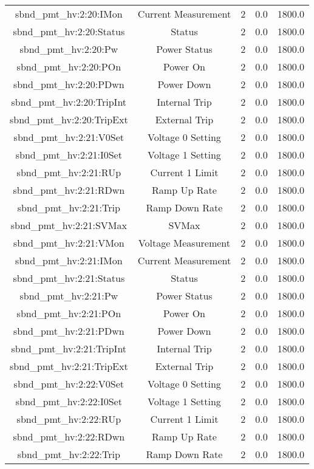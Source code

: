 \begin{table}[ptb]
\begin{tabular}{c | c c c c}
sbnd_pmt_hv:2:20:IMon & Current Measurement & 2 & 0.0 & 1800.0\\ 
sbnd_pmt_hv:2:20:Status & Status & 2 & 0.0 & 1800.0\\ 
sbnd_pmt_hv:2:20:Pw & Power Status & 2 & 0.0 & 1800.0\\ 
sbnd_pmt_hv:2:20:POn & Power On & 2 & 0.0 & 1800.0\\ 
sbnd_pmt_hv:2:20:PDwn & Power Down & 2 & 0.0 & 1800.0\\ 
sbnd_pmt_hv:2:20:TripInt & Internal Trip & 2 & 0.0 & 1800.0\\ 
sbnd_pmt_hv:2:20:TripExt & External Trip & 2 & 0.0 & 1800.0\\ 
sbnd_pmt_hv:2:21:V0Set & Voltage 0 Setting & 2 & 0.0 & 1800.0\\ 
sbnd_pmt_hv:2:21:I0Set & Voltage 1 Setting & 2 & 0.0 & 1800.0\\ 
sbnd_pmt_hv:2:21:RUp & Current 1 Limit & 2 & 0.0 & 1800.0\\ 
sbnd_pmt_hv:2:21:RDwn & Ramp Up Rate & 2 & 0.0 & 1800.0\\ 
sbnd_pmt_hv:2:21:Trip & Ramp Down Rate & 2 & 0.0 & 1800.0\\ 
sbnd_pmt_hv:2:21:SVMax & SVMax & 2 & 0.0 & 1800.0\\ 
sbnd_pmt_hv:2:21:VMon & Voltage Measurement & 2 & 0.0 & 1800.0\\ 
sbnd_pmt_hv:2:21:IMon & Current Measurement & 2 & 0.0 & 1800.0\\ 
sbnd_pmt_hv:2:21:Status & Status & 2 & 0.0 & 1800.0\\ 
sbnd_pmt_hv:2:21:Pw & Power Status & 2 & 0.0 & 1800.0\\ 
sbnd_pmt_hv:2:21:POn & Power On & 2 & 0.0 & 1800.0\\ 
sbnd_pmt_hv:2:21:PDwn & Power Down & 2 & 0.0 & 1800.0\\ 
sbnd_pmt_hv:2:21:TripInt & Internal Trip & 2 & 0.0 & 1800.0\\ 
sbnd_pmt_hv:2:21:TripExt & External Trip & 2 & 0.0 & 1800.0\\ 
sbnd_pmt_hv:2:22:V0Set & Voltage 0 Setting & 2 & 0.0 & 1800.0\\ 
sbnd_pmt_hv:2:22:I0Set & Voltage 1 Setting & 2 & 0.0 & 1800.0\\ 
sbnd_pmt_hv:2:22:RUp & Current 1 Limit & 2 & 0.0 & 1800.0\\ 
sbnd_pmt_hv:2:22:RDwn & Ramp Up Rate & 2 & 0.0 & 1800.0\\ 
sbnd_pmt_hv:2:22:Trip & Ramp Down Rate & 2 & 0.0 & 1800.0\\ 

\end{tabular}
\end{table}
